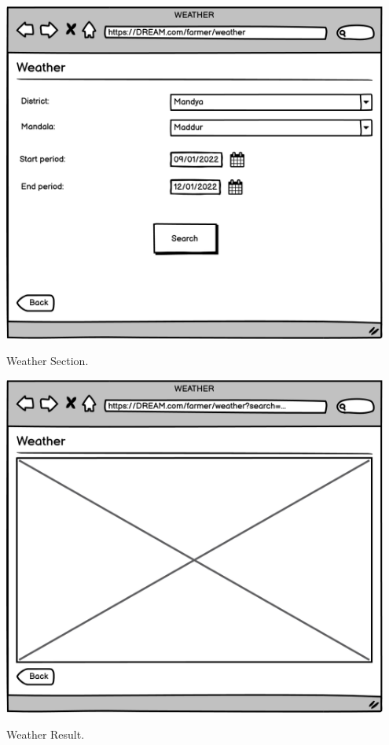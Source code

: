 \vspace{0.5cm}
\begin{minipage}{.5\textwidth}
	\centering
	\includegraphics[width=0.95\textwidth]{Images/Mockup/Farmer/11FarmerWeather.png}
	\captionsetup{type=figure}
	\caption{Weather Section.}
\end{minipage}%
\begin{minipage}{.5\textwidth}
	\centering
	\includegraphics[width=0.95\textwidth]{Images/Mockup/Farmer/12FarmerWeatherSearch.png}
	\captionsetup{type=figure}
	\caption{Weather Result.}
\end{minipage}
